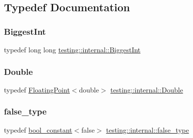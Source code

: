 \subsection{Typedef Documentation}
\mbox{\label{namespacetesting_1_1internal_a05c6bd9ede5ccdf25191a590d610dcc6}} 
\subsubsection{\texorpdfstring{BiggestInt}{BiggestInt}}
{\footnotesize\ttfamily typedef long long \mbox{\hyperlink{namespacetesting_1_1internal_a05c6bd9ede5ccdf25191a590d610dcc6}{testing\+::internal\+::\+Biggest\+Int}}}

\mbox{\label{namespacetesting_1_1internal_a66a7579b1893b260c31dad577f7a5c48}} 
\subsubsection{\texorpdfstring{Double}{Double}}
{\footnotesize\ttfamily typedef \mbox{\hyperlink{classtesting_1_1internal_1_1_floating_point}{Floating\+Point}}$<$double$>$ \mbox{\hyperlink{namespacetesting_1_1internal_a66a7579b1893b260c31dad577f7a5c48}{testing\+::internal\+::\+Double}}}

\mbox{\label{namespacetesting_1_1internal_abb1d0789f19bdde21affccbd1078b525}} 
\subsubsection{\texorpdfstring{false\_type}{false\_type}}
{\footnotesize\ttfamily typedef \mbox{\hyperlink{structtesting_1_1internal_1_1bool__constant}{bool\+\_\+constant}}$<$false$>$ \mbox{\hyperlink{namespacetesting_1_1internal_abb1d0789f19bdde21affccbd1078b525}{testing\+::internal\+::false\+\_\+type}}}

\mbox{\label{namespacetesting_1_1internal_a02e1981f5ff70609e6ac06e006ff519a}} 

